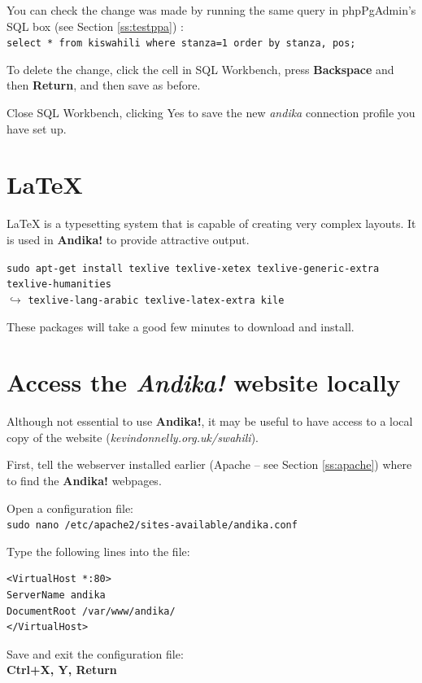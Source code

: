 \documentclass[a4paper,10pt, oneside]{book}
\begin{document}
You can check the change was made by running the same query in phpPgAdmin's SQL box (see Section \ref{ss:testppa}) :\\
\verb|select * from kiswahili where stanza=1 order by stanza, pos;|

To delete the change, click the cell in SQL Workbench, press \textbf{Backspace} and then \textbf{Return}, and then save as before.

Close SQL Workbench, clicking Yes to save the new \textit{andika} connection profile you have set up.


\section{LaTeX}

LaTeX is a typesetting system that is capable of creating very complex layouts.  It is used in \textbf{Andika!} to provide attractive output.

\verb|sudo apt-get install texlive texlive-xetex texlive-generic-extra texlive-humanities|\\
$\hookrightarrow$ \verb|texlive-lang-arabic texlive-latex-extra kile|

These packages will take a good few minutes to download and install.


\section{Access the \textit{Andika!} website locally}
\label{s:localaccess}

Although not essential to use \textbf{Andika!}, it may be useful to have access to a local copy of the website (\textit{kevindonnelly.org.uk/swahili}).  

First, tell the webserver installed earlier (Apache -- see Section \ref{ss:apache}) where to find the\textbf{ Andika!} webpages.

Open a configuration file:\\
\verb|sudo nano /etc/apache2/sites-available/andika.conf|

Type the following lines into the file:\\
\vspace{-0.5cm}  %
\begin{verbatim}
<VirtualHost *:80>
ServerName andika
DocumentRoot /var/www/andika/
</VirtualHost>
\end{verbatim}

Save and exit the configuration file:\\
\textbf{Ctrl+X, Y, Return}
\end{document}
